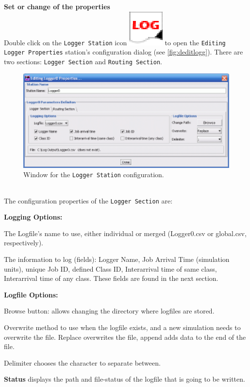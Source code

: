 \noindent \textbf{Set or change of the properties}\\
Double click on the \texttt{Logger Station} icon
\includegraphics[scale=.5]{img/jsimg/logger}
to open the \texttt{Editing Logger Properties} station's
configuration dialog (see \autoref{fig:deditlogg}). There are two
sections:
\texttt{Logger Section} and \texttt{Routing Section}.\\
\begin{figure}[htb]
    \begin{center}
        \includegraphics[scale=.8]{img/jsimg/logger_editFull_sm.eps}
    \end{center}
    \caption{Window for the \texttt{Logger Station} configuration.}
    \label{fig:deditlogg}
\end{figure}

\\
The configuration properties of the \texttt{Logger Section} are:
\begin{itemize*} \item \textbf{Logging Options:}
\begin{itemize*} \item   The Logfile's name to use, either individual or merged
(Logger0.csv or global.csv, respectively). \item The information
to log (fields): Logger Name, Job Arrival Time (simulation units),
unique Job ID, defined Class ID, Interarrival time of same class,
Interarrival time of any class. These fields are found in the next
section. \end{itemize*} \item \textbf{Logfile Options:}
\begin{itemize*} \item Browse button: allows changing the directory where
logfiles are stored. \item Overwrite method to use when the
logfile exists, and a new simulation needs to overwrite the file.
Replace overwrites the file, append adds data to the end of the
file. \item Delimiter chooses the character to separate between.
\end{itemize*}
\item \textbf{Status} displays the path and file-status of the
logfile that is going to be written.
\end{itemize*}

